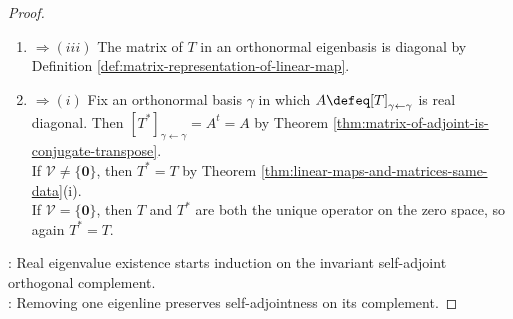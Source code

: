 \begin{theorem}
\begin{proof}
\begin{enumerate}[label=(\roman*)]
The identity $\dim(\mathcal{U}^{\perp})=n-1$ holds by Corollary \ref{cor:dimension-of-orthogonal-complement}, so $\mathcal{U}^{\perp}$ has an orthonormal eigenbasis by the induction hypothesis.\\
Adjoining $\mathbf{u}$ forms an orthonormal eigenbasis of $\mathcal{V}=\mathcal{U}\oplus\mathcal{U}^{\perp}$ by Theorem \ref{thm:orthogonal-direct-sum-decomposition}.
\item[$(ii)$] $\Rightarrow (iii)$ The matrix of $T$ in an orthonormal eigenbasis is diagonal by Definition \ref{def:matrix-representation-of-linear-map}.
\item[$(iii)$] $\Rightarrow (i)$ Fix an orthonormal basis $\gamma$ in which $A\defeq[T]_{\gamma\leftarrow\gamma}$ is real diagonal. Then $[T^*]_{\gamma\leftarrow\gamma}=A^t=A$ by Theorem \ref{thm:matrix-of-adjoint-is-conjugate-transpose}.\\
If $\mathcal{V}\neq\{\mathbf{0}\}$, then $T^*=T$ by Theorem \ref{thm:linear-maps-and-matrices-same-data}(i).\\
If $\mathcal{V}=\{\mathbf{0}\}$, then $T$ and $T^*$ are both the unique operator on the zero space, so again $T^*=T$.
\end{enumerate}
: Real eigenvalue existence starts induction on the invariant self-adjoint orthogonal complement.\\
: Removing one eigenline preserves self-adjointness on its complement.
\end{proof}
\end{theorem}

